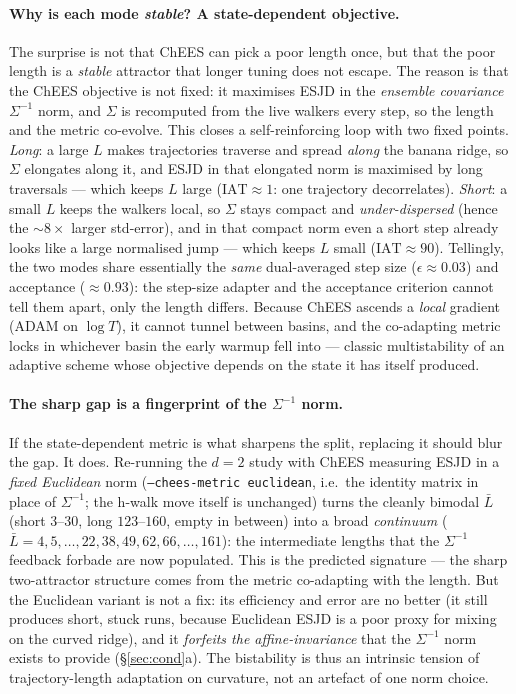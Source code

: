 \documentclass[11pt]{article}
\begin{document}
\paragraph{Why is each mode \emph{stable}? A state-dependent objective.} The
surprise is not that ChEES can pick a poor length once, but that the poor length
is a \emph{stable} attractor that longer tuning does not escape. The reason is
that the ChEES objective is not fixed: it maximises ESJD in the \emph{ensemble
covariance} $\Sigma^{-1}$ norm, and $\Sigma$ is recomputed from the live walkers
every step, so the length and the metric co-evolve. This closes a self-reinforcing
loop with two fixed points. \emph{Long}: a large $L$ makes trajectories traverse
and spread \emph{along} the banana ridge, so $\Sigma$ elongates along it, and
ESJD in that elongated norm is maximised by long traversals --- which keeps $L$
large ($\mathrm{IAT}\!\approx\!1$: one trajectory decorrelates). \emph{Short}: a
small $L$ keeps the walkers local, so $\Sigma$ stays compact and
\emph{under-dispersed} (hence the $\sim\!8\times$ larger std-error), and in that
compact norm even a short step already looks like a large normalised jump ---
which keeps $L$ small ($\mathrm{IAT}\!\approx\!90$). Tellingly, the two modes
share essentially the \emph{same} dual-averaged step size ($\epsilon\!\approx\!
0.03$) and acceptance ($\approx\!0.93$): the step-size adapter and the acceptance
criterion cannot tell them apart, only the length differs. Because ChEES ascends a
\emph{local} gradient (ADAM on $\log T$), it cannot tunnel between basins, and the
co-adapting metric locks in whichever basin the early warmup fell into --- classic
multistability of an adaptive scheme whose objective depends on the state it has
itself produced.

\paragraph{The sharp gap is a fingerprint of the $\Sigma^{-1}$ norm.} If the
state-dependent metric is what sharpens the split, replacing it should blur the
gap. It does. Re-running the $d{=}2$ study with ChEES measuring ESJD in a
\emph{fixed Euclidean} norm (\texttt{--chees-metric euclidean}, i.e.\ the
identity matrix in place of $\Sigma^{-1}$; the h-walk move itself is unchanged)
turns the cleanly bimodal $\bar L$ (short $3$--$30$, long $123$--$160$, empty in
between) into a broad \emph{continuum} ($\bar L\!=\!4,5,\dots,22,38,49,62,66,
\dots,161$): the intermediate lengths that the $\Sigma^{-1}$ feedback forbade are
now populated. This is the predicted signature --- the sharp two-attractor
structure comes from the metric co-adapting with the length. But the Euclidean
variant is not a fix: its efficiency and error are no better (it still produces
short, stuck runs, because Euclidean ESJD is a poor proxy for mixing on the
curved ridge), and it \emph{forfeits the affine-invariance} that the $\Sigma^{-1}$
norm exists to provide (\S\ref{sec:cond}a). The bistability is thus an intrinsic
tension of trajectory-length adaptation on curvature, not an artefact of one norm
choice.
\end{document}
